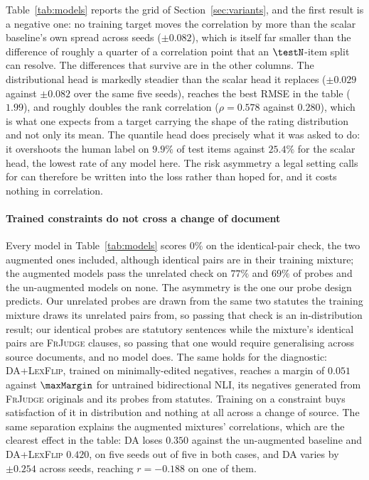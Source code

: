 \documentclass{BVP_JCLLT}
\begin{document}
Table~\ref{tab:models} reports the grid of Section~\ref{sec:variants}, and the
first result is a negative one: no training target moves the correlation by more
than the scalar baseline's own spread across seeds ($\pm0.082$), which is itself
far smaller than the difference of roughly a quarter of a correlation point that
an $\testN$-item split can resolve. The differences that survive are in the
other columns. The distributional head is markedly steadier than the scalar head
it replaces ($\pm0.029$ against $\pm0.082$ over the same five seeds), reaches the
best RMSE in the table ($1.99$), and roughly doubles the rank correlation
($\rho=0.578$ against $0.280$), which is what one expects from a target carrying
the shape of the rating distribution and not only its mean. The quantile head
does precisely what it was asked to do: it overshoots the human label on $9.9\%$
of test items against $25.4\%$ for the scalar head, the lowest rate of any model
here. The risk asymmetry a legal setting calls for can therefore be written into
the loss rather than hoped for, and it costs nothing in correlation.

\paragraph{Trained constraints do not cross a change of document}
Every model in Table~\ref{tab:models} scores $0\%$ on the identical-pair check,
the two augmented ones included, although identical pairs are in their training
mixture; the augmented models pass the unrelated check on $77\%$ and $69\%$ of
probes and the un-augmented models on none. The asymmetry is the one our probe
design predicts. Our unrelated probes are drawn from the same two statutes the
training mixture draws its unrelated pairs from, so passing that check is an
in-distribution result; our identical probes are statutory sentences while the
mixture's identical pairs are \textsc{FrJudge} clauses, so passing that one
would require generalising across source documents, and no model does. The same
holds for the diagnostic: \textsc{DA+LexFlip}, trained on minimally-edited
negatives, reaches a margin of $0.051$ against $\maxMargin$ for untrained
bidirectional NLI, its negatives generated from \textsc{FrJudge} originals and
its probes from statutes. Training on a constraint buys satisfaction of it in
distribution and nothing at all across a change of source. The same separation
explains the augmented mixtures' correlations, which are the clearest effect in
the table: \textsc{DA} loses $0.350$ against the un-augmented baseline and
\textsc{DA+LexFlip} $0.420$, on five seeds out of five in both cases, and
\textsc{DA} varies by $\pm0.254$ across seeds, reaching $r=-0.188$ on one of
them.
\end{document}
